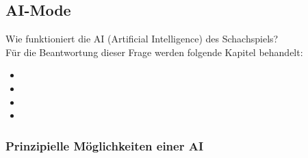\documentclass[12pt,a4paper]{article}
\begin{document}
{\subsection{AI-Mode}
\label{SUBSEC:AI-MODE}

Wie funktioniert die AI (Artificial Intelligence) des Schachspiels? \\
Für die Beantwortung dieser Frage werden folgende Kapitel behandelt:

\begin{itemize}
	\item{}
	\item{}
	\item{}
	\item{}
\end{itemize}



\subsubsection{Prinzipielle Möglichkeiten einer AI}
\label{SUBSUBSEC:GenAI}

}
\end{document}
